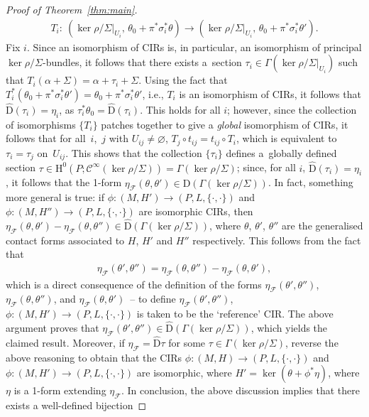 \documentclass[pdftex]{sigma}
\numberwithin{equation}{section}
\newcommand{\JM}{(P,L,\{\cdot,\cdot\})} %
\newcommand{\CM}{(M,H)} %
\newcommand{\HH}{\mathrm{H}}
\begin{document}
\begin{proof}[Proof of Theorem~\ref{thm:main}]
 \begin{gather*}
 T_i \colon \ (\ker \rho/\Sigma|_{U_i},\, \theta_0 + \pi^* \sigma^*_i \theta ) \to (\ker \rho/\Sigma|_{U_i}, \, \theta_0 + \pi^* \sigma^*_i
 \theta' ).
 \end{gather*}
Fix $i$. Since an isomorphism of CIRs is, in particular, an isomorphism of principal $\ker \rho/\Sigma$-bundles, it follows that there exists a~section $\tau_i \in \Gamma (\ker \rho/\Sigma|_{U_i} )$ such that $T_i(\alpha + \Sigma) = \alpha + \tau_i +\Sigma$. Using the fact that $T_i^* (\theta_0 +\pi^*\sigma^*_i \theta' ) =\theta_0 +\pi^*\sigma^*_i \theta'$, i.e., $T_i$ is an isomorphism of CIRs, it follows that $\hat{\mathrm{D}}(\tau_i) = \eta_i$, as $\tau_i^* \theta_0 = \hat{\mathrm{D}}(\tau_i)$. This holds for all $i$; however, since the collection of isomorphisms $\{T_i\}$ patches together to give a {\em global} isomorphism of CIRs, it follows that for all~$i$,~$j$ with $U_{ij} \neq \varnothing$, $T_j \circ t_{ij} = t_{ij} \circ T_i$, which is equivalent to $\tau_i = \tau_j$ on~$U_{ij}$. This shows that the collection $\{\tau_i\}$ def\/ines a~globally def\/ined section $\tau \in \HH^0(P;\mathcal{C}^{\infty}(\ker \rho/\Sigma)) = \Gamma(\ker \rho/\Sigma)$; since, for all $i$, $\hat{\mathrm{D}}(\tau_i) = \eta_i$, it follows that the 1-form $\eta_{\mathcal{F}}(\theta,\theta') \in \hat{\mathrm{D}} (\Gamma (\ker \rho/\Sigma))$. In fact, something more general is true: if $\phi \colon (M,H') \to \JM$ and $\phi \colon (M,H'') \to \JM$ are isomorphic CIRs, then $\eta_{\mathcal{F}}(\theta,\theta') - \eta_{\mathcal{F}}(\theta,\theta'') \in \hat{\mathrm{D}}(\Gamma(\ker \rho/\Sigma))$, where $\theta$, $\theta'$, $\theta''$ are the generalised contact forms associated to $H$, $H'$ and $H''$ respectively. This follows from the fact that
 \begin{gather*}
 \eta_{\mathcal{F}}(\theta',\theta'') = \eta_{\mathcal{F}}(\theta,\theta'') - \eta_{\mathcal{F}}(\theta,\theta'),
 \end{gather*}
which is a direct consequence of the def\/inition of the forms $\eta_{\mathcal{F}}(\theta',\theta'')$, $\eta_{\mathcal{F}}(\theta,\theta'')$, and $ \eta_{\mathcal{F}}(\theta, \theta')$~-- to def\/ine $\eta_{\mathcal{F}}(\theta',\theta'')$, $\phi \colon (M,H') \to \JM$ is taken to be the `reference' CIR. The above argument proves that $\eta_{\mathcal{F}}(\theta',\theta'') \in \hat{\mathrm{D}}(\Gamma(\ker \rho/\Sigma))$, which yields the claimed result. Moreover, if $\eta_{\mathcal{F}} = \hat{\mathrm{D}}\tau$ for some $\tau \in \Gamma(\ker \rho/\Sigma)$, reverse the above reasoning to obtain that the CIRs $\phi \colon \CM \to \JM$ and $\phi \colon (M,H') \to \JM$ are isomorphic, where $H' = \ker (\theta + \phi^*\eta)$, where $\eta$ is a 1-form extending $\eta_{\mathcal{F}}$. In conclusion, the above discussion implies that there exists a well-def\/ined bijection

\end{proof}
\end{document}
